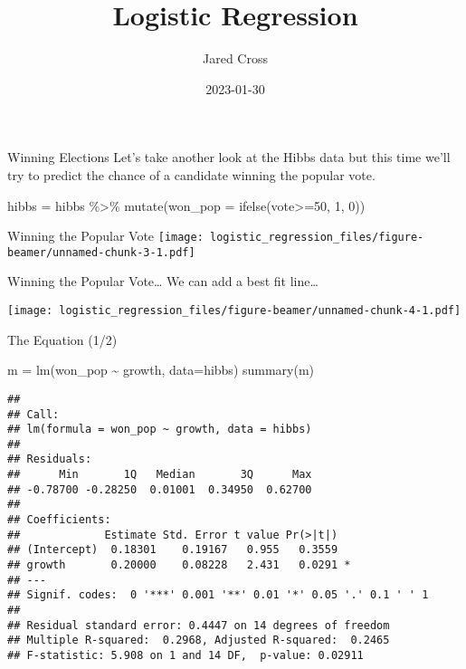 \documentclass[
  ignorenonframetext,
]{beamer}
\title{Logistic Regression}
\author{Jared Cross}
\date{2023-01-30}
\newenvironment{Shaded}{\begin{snugshade}}{\end{snugshade}}
\newcommand{\AttributeTok}[1]{\textcolor[rgb]{0.77,0.63,0.00}{#1}}
\newcommand{\DecValTok}[1]{\textcolor[rgb]{0.00,0.00,0.81}{#1}}
\newcommand{\FunctionTok}[1]{\textcolor[rgb]{0.00,0.00,0.00}{#1}}
\newcommand{\NormalTok}[1]{#1}
\newcommand{\OtherTok}[1]{\textcolor[rgb]{0.56,0.35,0.01}{#1}}
\newcommand{\SpecialCharTok}[1]{\textcolor[rgb]{0.00,0.00,0.00}{#1}}
\begin{document}
\frame{\titlepage}

\begin{frame}[fragile]{Winning Elections}
\protect\hypertarget{winning-elections}{}
Let's take another look at the Hibbs data but this time we'll try to
predict the chance of a candidate winning the popular vote.

\begin{Shaded}
\begin{Highlighting}[]
\NormalTok{hibbs }\OtherTok{=} 
\NormalTok{hibbs }\SpecialCharTok{\%\textgreater{}\%} 
  \FunctionTok{mutate}\NormalTok{(}\AttributeTok{won\_pop =} \FunctionTok{ifelse}\NormalTok{(vote}\SpecialCharTok{\textgreater{}=}\DecValTok{50}\NormalTok{, }\DecValTok{1}\NormalTok{, }\DecValTok{0}\NormalTok{))}
\end{Highlighting}
\end{Shaded}
\end{frame}

\begin{frame}{Winning the Popular Vote}
\protect\hypertarget{winning-the-popular-vote}{}
\texttt{[image: logistic\_regression\_files/figure-beamer/unnamed-chunk-3-1.pdf]}
\end{frame}

\begin{frame}{Winning the Popular Vote\ldots{}}
\protect\hypertarget{winning-the-popular-vote-1}{}
We can add a best fit line\ldots{}

\texttt{[image: logistic\_regression\_files/figure-beamer/unnamed-chunk-4-1.pdf]}
\end{frame}

\begin{frame}[fragile]{The Equation (1/2)}
\protect\hypertarget{the-equation-12}{}
\begin{Shaded}
\begin{Highlighting}[]
\NormalTok{m }\OtherTok{=} \FunctionTok{lm}\NormalTok{(won\_pop }\SpecialCharTok{\textasciitilde{}}\NormalTok{ growth, }\AttributeTok{data=}\NormalTok{hibbs)}
\FunctionTok{summary}\NormalTok{(m)}
\end{Highlighting}
\end{Shaded}

\begin{verbatim}
## 
## Call:
## lm(formula = won_pop ~ growth, data = hibbs)
## 
## Residuals:
##      Min       1Q   Median       3Q      Max 
## -0.78700 -0.28250  0.01001  0.34950  0.62700 
## 
## Coefficients:
##             Estimate Std. Error t value Pr(>|t|)  
## (Intercept)  0.18301    0.19167   0.955   0.3559  
## growth       0.20000    0.08228   2.431   0.0291 *
## ---
## Signif. codes:  0 '***' 0.001 '**' 0.01 '*' 0.05 '.' 0.1 ' ' 1
## 
## Residual standard error: 0.4447 on 14 degrees of freedom
## Multiple R-squared:  0.2968, Adjusted R-squared:  0.2465 
## F-statistic: 5.908 on 1 and 14 DF,  p-value: 0.02911
\end{verbatim}
\end{frame}
\end{document}
